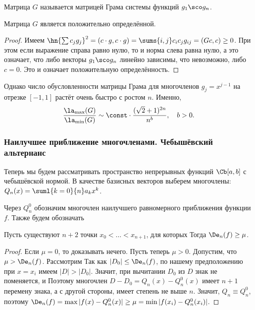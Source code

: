 \documentclass[a4paper]{article}
\begin{document}
Матрица $G$ называется матрицей Грама системы функций $g_1\sco g_n$.
\begin{stm}
Матрица $G$ является положительно определённой.
\end{stm}
\begin{proof}
Имеем $\hn{\sum c_j g_j}^2 = (c \cdot g, c \cdot g) = \sums{i,j} c_i
c_j g_{ij} = (Gc, c) \ge 0$.  При этом если выражение справа равно
нулю, то и норма слева равна нулю, а это означает, что либо векторы
$g_1\sco g_n$ линейно зависимы, что невозможно, либо $c = 0$. Это и
означает положительную определённость.
\end{proof}

Однако число обусловленности матрицы Грама для многочленов $g_j =
x^{j-1}$ на отрезке $[-1,1]$ растёт очень быстро с ростом $n$. Именно,
$$\frac{\la_{\max}(G)}{\la_{\min}(G)} \sim \const \cdot\frac{(\sqrt2 +
  1)^{2n}}{n^b}, \quad b > 0.$$

\subsubsection{Наилучшее приближение многочленами. Чебышёвский альтернанс}

Теперь мы будем рассматривать пространство непрерывных функций
$\Cb[a,b]$ с чебышёвской нормой.  В качестве базисных векторов выберем
многочлены: $Q_n(x) = \suml{k=0}{n} a_k x^k$.

Через $Q_n^0$ обозначим многочлен наилучшего равномерного приближения
функции $f$.  Также будем обозначать 

\begin{theorem}
Пусть существуют $n+2$ точки $x_0 <\ldots<x_{n+1}$, для которых
  Тогда
$\De_n(f) \ge \mu$.
\end{theorem}
\begin{proof}
Если $\mu = 0$, то доказывать нечего.  Пусть теперь $\mu >
0$. Допустим, что $\mu > \De_n(f)$.  Рассмотрим
  Так как $|D_0| \le \De_n(f)$, по
нашему предположению при $x = x_i$ имеем $|D| > |D_0|$.  Значит, при
вычитании $D_0$ из $D$ знак не поменяется, и
  Поэтому многочлен $D-D_0 = Q_n(x) -
Q_n^0(x)$ имеет $n+1$ перемену знака, а с другой стороны, имеет
степень не выше $n$.  Значит, $Q_n \equiv Q_n^0$, поэтому $\De_n(f) =
\max |f(x)-Q_n^0(x)| \ge \mu = \min |f(x_i)-Q_n^0(x_i)|$.
\end{proof}
\end{document}
